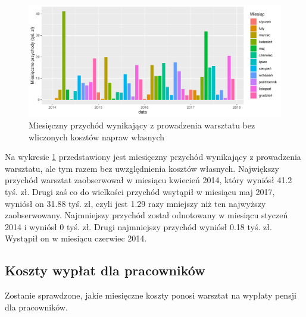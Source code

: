 \documentclass{article}\usepackage[]{graphicx}\usepackage[]{xcolor}
\makeatletter
\def\maxwidth{ %
  \ifdim\Gin@nat@width>\linewidth
    \linewidth
  \else
    \Gin@nat@width
  \fi
}
\newenvironment{knitrout}{}{} %
\makeatother
\begin{document}
\begin{knitrout}
\color{fgcolor}\begin{figure}[H]

{\centering \includegraphics[width=\maxwidth]{figure/fig_uslugi2-1} 

}

\caption[Miesięczny przychód wynikający z prowadzenia warsztatu bez wliczonych kosztów napraw własnych]{Miesięczny przychód wynikający z prowadzenia warsztatu bez wliczonych kosztów napraw własnych}\label{fig:fig_uslugi2}
\end{figure}

\end{knitrout}

Na wykresie \ref{fig:fig_uslugi2} przedstawiony jest miesięczny przychód wynikający z prowadzenia warsztatu, ale tym razem bez uwzględnienia kosztów własnych. 
Największy przychód warsztat zaobserwował w miesiącu kwiecień 2014, który wyniósł 41.2 tyś. zł.
Drugi zaś co do wielkości przychód wsytąpił w miesiącu maj 2017, wyniósł on 31.88 tyś. zł, czyli jest 1.29 razy mniejszy niż ten najwyższy zaobserwowany.
Najmniejszy przychód został odnotowany w miesiącu styczeń 2014 i wyniósł 0 tyś. zł. 
Drugi najmniejszy przychód wyniósł 0.18 tyś. zł. Wystąpił on w miesiącu czerwiec 2014.

\subsection{Koszty wypłat dla pracowników}

Zostanie sprawdzone, jakie miesięczne koszty ponosi warsztat na wypłaty pensji dla pracowników.

\end{document}
